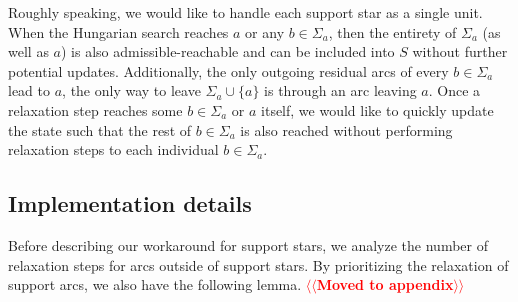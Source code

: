 \documentclass[a4paper,UKenglish]{socg-lipics-v2018}
\makeatletter
\def\note#1{\textcolor{red}{{#1}}}
\theoremstyle{plain}
\numberwithin{figure}{section}
\def\n@te#1{\textsf{\boldmath \textbf{$\langle\!\langle$#1$\rangle\!\rangle$}}\leavevmode}
\def\note#1{\textcolor{red}{\n@te{#1}}}
\makeatother
\begin{document}
Roughly speaking, we would like to handle each support star as a single unit.
When the Hungarian search reaches $a$ or any $b \in \Sigma_a$, then the
entirety of $\Sigma_a$ (as well as $a$) is also admissible-reachable and can be
included into $S$ without further potential updates.
Additionally, the only outgoing residual arcs of every $b \in \Sigma_a$ lead to
$a$, the only way to leave $\Sigma_a \cup \{a\}$ is through an arc leaving $a$.
Once a relaxation step reaches some $b \in \Sigma_a$ or $a$ itself, we would
like to quickly update the state such that the rest of $b \in \Sigma_a$ is also
reached without performing relaxation steps to each individual
$b \in \Sigma_a$.

\subsection{Implementation details}

Before describing our workaround for support stars, we analyze the number of
relaxation steps for arcs outside of support stars.
By prioritizing the relaxation of support arcs, we also have the following
lemma. \note{Moved to appendix}
\end{document}

